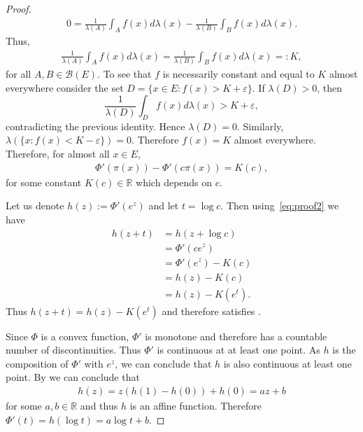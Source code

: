 \documentclass{article}
\newcommand{\cM}{\mathcal M}
\newcommand{\R}{\mathbb R}
\newcommand{\X}{E}
\begin{document}
\begin{proof}
\begin{align*}
    0 = \frac{1}{\lambda(A)}\int_A f(x) d\lambda(x)
- \frac{1}{\lambda(B)}\int_B f(x) d\lambda(x).
\end{align*}
Thus, 
\begin{align*}
\frac{1}{\lambda(A)}\int_A f(x) d\lambda(x)
= \frac{1}{\lambda(B)}\int_B f(x) d\lambda(x)=: K,
\end{align*}
for all $A, B \in \mathcal{B}(\X)$. 
To see that $f$ is necessarily constant and equal to $K$ almost everywhere consider the set $D = \{x\in \X : f(x) > K + \varepsilon\}$. If $\lambda(D) > 0$, then
\[
\frac{1}{\lambda(D)}\int_{D} f(x) d\lambda(x) > K + \varepsilon,
\]
contradicting the previous identity. Hence $\lambda(D) = 0$. Similarly,
$\lambda(\{x: f(x) < K - \varepsilon\})=0$. Therefore $f(x)=K$ almost everywhere.
Therefore, for almost all  $x\in\X$,
\begin{align}
\label{eq:proof2}
    \Phi'(\pi(x))-\Phi'(c\pi(x)) = K(c),
\end{align}
for some constant $K(c)\in\R$ which depends on $c$.



Let us denote $h(z):=\Phi'(e^z)$ and let $t=\log c$. Then using~\eqref{eq:proof2} we have
\begin{align*}
    h(z+t) &= h(z+\log c) \\
    &= \Phi'(c e^z) \\
    &=\Phi'(e^z)- K(c) \\
    &= h(z)-K(c) \\
    &= h(z)-K(e^t).
\end{align*}
Thus $h(z+t) = h(z)-K(e^t)$ and therefore satisfies \citet[Eq. (2)]{8b1c4492-9d75-38af-ba80-93b1f0ce1772}.

Since $\Phi$ is a convex function, $\Phi'$ is monotone and therefore has a countable number of discontinuities. Thus $\Phi'$ is continuous at at least one point. As $h$ is the composition of $\Phi'$ with $e^z$, we can conclude that $h$ is also continuous at least one point.
By \citet[Theorem 2]{8b1c4492-9d75-38af-ba80-93b1f0ce1772} we can conclude that 
\begin{align*}
    h(z) = z(h(1)-h(0))+h(0) = az+b
\end{align*}
for some $a, b\in\R$ and thus $h$ is an affine function. 
Therefore $\Phi'(t) = h(\log t) = a\log t+b$.



\end{proof}
\end{document}
